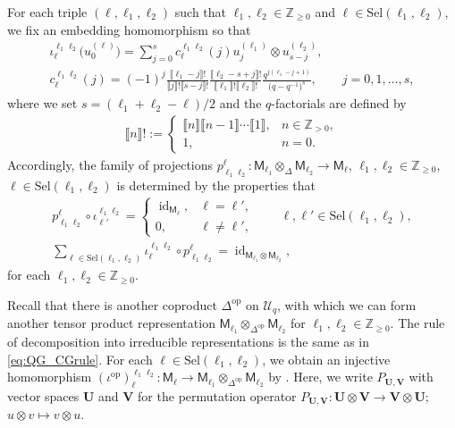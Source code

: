 \documentclass[pdftex]{sigma}
\numberwithin{equation}{section}
\newcommand{\id}{\operatorname{id}}
\newcommand{\op}{\mathrm{op}}
\newcommand{\bZ}{\mathbb{Z}}
\newcommand{\cU}{\mathcal{U}}
\newcommand{\sfM}{\mathsf{M}}
\newcommand{\qint}[1]{\llbracket #1 \rrbracket}
\newcommand{\UEA}{\cU}
\newcommand{\Uq}{\UEA_{q}}
\newcommand{\QGirrep}[1]{\sfM_{#1}}
\newcommand{\QGirvec}[2]{u^{(#1)}_{#2}}
\newcommand{\QGcoprod}{\Delta}
\newcommand{\CGemb}[3]{\iota_{#1}^{#2 #3}}
\newcommand{\CGproj}[3]{p^{#1}_{#2 #3}}
\newcommand{\CGcoeff}[4]{c_{#1}^{#2 #3}(#4)}
\newcommand{\CGembop}[3]{(\iota^{\op})_{#1}^{#2 #3}}
\newcommand{\Sel}{\mathrm{Sel}}
\newcommand{\VecspU}{\mathbf{U}}
\newcommand{\VecspV}{\mathbf{V}}
\begin{document}
For each triple $(\ell,\ell_{1},\ell_{2})$ such that $\ell_{1},\ell_{2}\in \bZ_{\geq 0}$ and $\ell\in \Sel (\ell_{1},\ell_{2})$, we fix an embedding homomorphism \smash{$\CGemb{\ell}{\ell_{1}}{\ell_{2}}\colon \QGirrep{\ell}\to \QGirrep{\ell_{1}}\otimes_{\QGcoprod} \QGirrep{\ell_{2}}$} so that
\begin{gather}
 \CGemb{\ell}{\ell_{1}}{\ell_{2}}\big(\QGirvec{\ell}{0}\big)=\sum_{j=0}^{s}\CGcoeff{\ell}{\ell_{1}}{\ell_{2}}{j} \QGirvec{\ell_{1}}{j}\otimes \QGirvec{\ell_{2}}{s-j}, \nonumber \\
 \CGcoeff{\ell}{\ell_{1}}{\ell_{2}}{j}=(-1)^{j}\frac{\qint{\ell_{1}-j}!}{\qint{j}!\qint{s-j}!}\frac{\qint{\ell_{2}-s+j}!}{\qint{\ell_{1}}!\qint{\ell_{2}}!}\frac{q^{j(\ell_{1}-j+1)}}{\big(q-q^{-1}\big)^{s}},\qquad j=0,1,\dots, s,\label{eq:CG_coeffs}
\end{gather}
where we set $s=(\ell_{1}+\ell_{2}-\ell)/2$ and the $q$-factorials are defined by
\begin{gather*}
 \qint{n}!:=
 \begin{cases}
 \qint{n}\qint{n-1}\cdots\qint{1},& n\in\bZ_{> 0},\\
 1, &n=0.
 \end{cases}
\end{gather*}
Accordingly, the family of projections $\CGproj{\ell}{\ell_{1}}{\ell_{2}}\colon \QGirrep{\ell_{1}}\otimes_{\QGcoprod} \QGirrep{\ell_{2}}\to \QGirrep{\ell}$, $\ell_{1},\ell_{2}\in\bZ_{\geq 0}$, $\ell\in\Sel (\ell_{1},\ell_{2})$ is determined by the properties that
\begin{gather*}
 \CGproj{\ell}{\ell_{1}}{\ell_{2}}\circ \CGemb{\ell'}{\ell_{1}}{\ell_{2}}=
 \begin{cases}
 \id_{\QGirrep{\ell}}, & \ell=\ell', \\
 0, & \ell\neq\ell',
 \end{cases}\qquad \ell,\ell'\in \Sel (\ell_{1},\ell_{2}), \\
 \sum_{\ell\in\Sel(\ell_{1},\ell_{2})}\CGemb{\ell}{\ell_{1}}{\ell_{2}}\circ \CGproj{\ell}{\ell_{1}}{\ell_{2}}=\id_{\QGirrep{\ell_{1}}\otimes\QGirrep{\ell_{2}}},
\end{gather*}
for each $\ell_{1},\ell_{2}\in\bZ_{\geq 0}$.

Recall that there is another coproduct $\QGcoprod^{\op}$ on $\Uq$, with which we can form another tensor product representation $\QGirrep{\ell_{1}}\otimes_{\QGcoprod^{\op}}\QGirrep{\ell_{2}}$ for $\ell_{1},\ell_{2}\in\bZ_{\geq 0}$.
The rule of decomposition into irreducible representations is the same as in \eqref{eq:QG_CGrule}.
For each $\ell\in \Sel(\ell_{1},\ell_{2})$, we obtain an injective homomorphism $\CGembop{\ell}{\ell_{1}}{\ell_{2}}\colon \QGirrep{\ell}\to \QGirrep{\ell_{1}}\otimes_{\QGcoprod^{\op}}\QGirrep{\ell_{2}}$ by
\smash{$
 \CGembop{\ell}{\ell_{1}}{\ell_{2}}:=P_{\QGirrep{\ell_{2}},\QGirrep{\ell_{1}}}\circ \CGemb{\ell}{\ell_{2}}{\ell_{1}}$}.
Here, we write $P_{\VecspU,\VecspV}$ with vector spaces $\VecspU$ and $\VecspV$ for the permutation operator
$
 P_{\VecspU,\VecspV}\colon \VecspU\otimes\VecspV\to \VecspV\otimes\VecspU$; $ u\otimes v\mapsto v\otimes u$.
\end{document}
